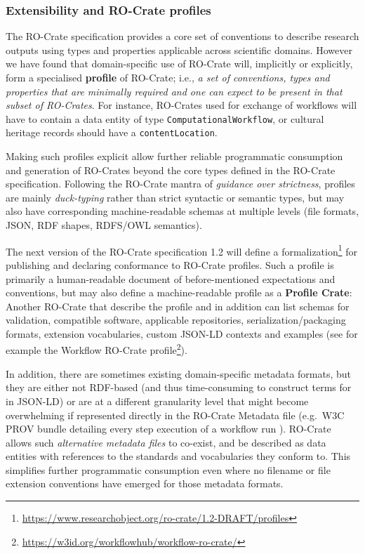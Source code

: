 \subsubsection{Extensibility and RO-Crate profiles}\label{ch5:profiles}

The RO-Crate specification provides a core set of conventions to
describe research outputs using types and properties applicable across
scientific domains. However we have found that domain-specific use of
RO-Crate will, implicitly or explicitly, form a specialised
\textbf{profile} of RO-Crate; i.e., \emph{a set of conventions, types
and properties that are minimally required and one can expect to be
present in that subset of RO-Crates}. For instance, RO-Crates used for
exchange of workflows will have to contain a data entity of type
\texttt{ComputationalWorkflow}, or cultural heritage records should have
a \texttt{contentLocation}.

Making such profiles explicit allow further reliable programmatic
consumption and generation of RO-Crates beyond the core types defined in
the RO-Crate specification. Following the RO-Crate mantra of
\emph{guidance over strictness}, profiles are mainly \emph{duck-typing}
rather than strict syntactic or semantic types, but may also have
corresponding machine-readable schemas at multiple levels (file formats,
JSON, RDF shapes, RDFS/OWL semantics).

The next version of the RO-Crate specification 1.2 will define a
formalization\footnote{\url{https://www.researchobject.org/ro-crate/1.2-DRAFT/profiles}}
for publishing and declaring conformance to RO-Crate profiles. Such a
profile is primarily a human-readable document of before-mentioned
expectations and conventions, but may also define a machine-readable
profile as a \textbf{Profile Crate}: Another RO-Crate that describe the
profile and in addition can list schemas for validation, compatible
software, applicable repositories, serialization/packaging formats,
extension vocabularies, custom JSON-LD contexts and examples (see for
example the Workflow RO-Crate
profile\footnote{\url{https://w3id.org/workflowhub/workflow-ro-crate/}}).


In addition, there are sometimes existing domain-specific metadata
formats, but they are either not RDF-based (and thus time-consuming to
construct terms for in JSON-LD) or are at a different granularity level
that might become overwhelming if represented directly in the RO-Crate
Metadata file (e.g.~W3C PROV bundle detailing every step execution of a
workflow run
\cite{ch5-68}). RO-Crate
allows such \emph{alternative metadata files} to co-exist, and be
described as data entities with references to the standards and
vocabularies they conform to. This simplifies further programmatic
consumption even where no filename or file extension conventions have
emerged for those metadata formats.


